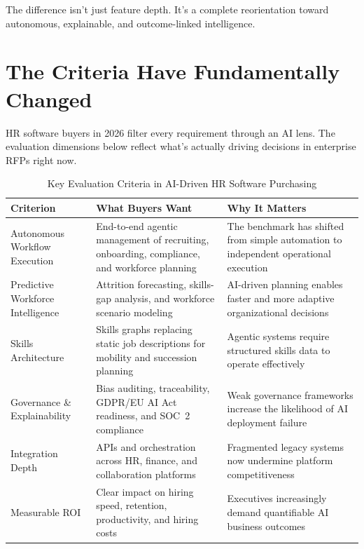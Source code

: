 \documentclass[12pt, a4paper]{article}
\begin{document}
The difference isn't just feature depth. It's a complete reorientation toward autonomous,
explainable, and outcome-linked intelligence.

\section{The Criteria Have Fundamentally Changed}

HR software buyers in 2026 filter every requirement through an AI lens. The evaluation
dimensions below reflect what's actually driving decisions in enterprise RFPs right now.

\begin{table}[h]
\centering
\footnotesize
\renewcommand{\arraystretch}{1.15}
\setlength{\tabcolsep}{5pt}

\begin{tabularx}{\linewidth}{
>{\raggedright\arraybackslash}p{3cm}
>{\raggedright\arraybackslash}X
>{\raggedright\arraybackslash}X}
\toprule

\textbf{Criterion} &
\textbf{What Buyers Want} &
\textbf{Why It Matters} \\

\midrule

Autonomous Workflow Execution &
End-to-end agentic management of recruiting, onboarding, compliance, and workforce planning &
The benchmark has shifted from simple automation to independent operational execution \\

Predictive Workforce Intelligence &
Attrition forecasting, skills-gap analysis, and workforce scenario modeling &
AI-driven planning enables faster and more adaptive organizational decisions \\

Skills Architecture &
Skills graphs replacing static job descriptions for mobility and succession planning &
Agentic systems require structured skills data to operate effectively \\

Governance \& Explainability &
Bias auditing, traceability, GDPR/EU AI Act readiness, and SOC~2 compliance &
Weak governance frameworks increase the likelihood of AI deployment failure~\cite{gartner2026} \\

Integration Depth &
APIs and orchestration across HR, finance, and collaboration platforms &
Fragmented legacy systems now undermine platform competitiveness \\

Measurable ROI &
Clear impact on hiring speed, retention, productivity, and hiring costs &
Executives increasingly demand quantifiable AI business outcomes~\cite{adp2025} \\

\bottomrule
\end{tabularx}

\caption{Key Evaluation Criteria in AI-Driven HR Software Purchasing}
\end{table}
\end{document}
